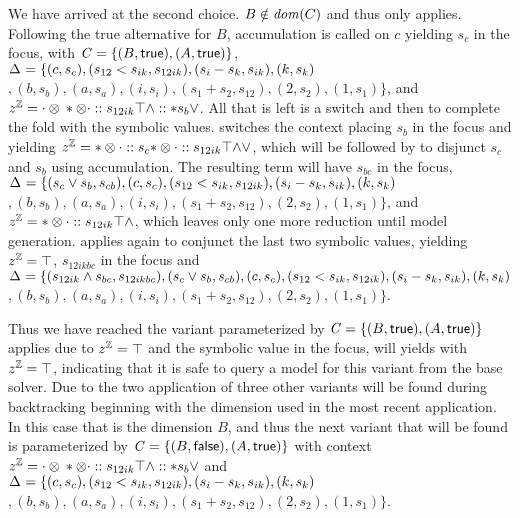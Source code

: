 We have arrived at the second choice. $B \notin \dom{C}$ and thus only \crChc
applies. Following the true alternative for $B$, accumulation is called on $c$
yielding $s_{c}$ in the focus, with $\configuration = \set{(B,\true),
  (A,\true)}$, $\aStore{}=\{(c,s_{c}),(s_{12} < s_{ik}, s_{12ik}),(s_{i} -
s_{k}, s_{ik}),(k,s_{k})$ $ ,(b, s_{b}), (a,s_{a}),(i, s_{i}),(s_{1} + s_{2},
s_{12}), (2,s_{2}), (1,s_{1})\}$, and $\zipper =
\inBoolL*{\inBoolR*{s_{12ik}}{\inRoot{}}{\wedge}}{s_{b}}{\vee}$. All that is
left is a switch and then to complete the fold with the symbolic values.
\crBoolL{} switches the context placing $s_{b}$ in the focus and yielding
$\zipper = \inBoolR*{s_{c}}{\inBoolR*{s_{12ik}}{\inRoot{}}{\wedge}}{\vee}$,
which will be followed by \crBoolR{} to disjunct $s_{c}$ and $s_{b}$ using
accumulation. The resulting term will have $s_{bc}$ in the focus,
$\aStore{}=\{(s_{c} \vee s_{b}, s_{cb}),(c,s_{c}),(s_{12} < s_{ik},
s_{12ik}),(s_{i} - s_{k}, s_{ik}),(k,s_{k})$ $ ,(b, s_{b}), (a,s_{a}),(i,
s_{i}),(s_{1} + s_{2}, s_{12}), (2,s_{2}), (1,s_{1})\}$, and $\zipper =
\inBoolR*{s_{12ik}}{\inRoot{}}{\wedge}$, which leaves only one more reduction
until model generation. \crBoolR{} applies again to conjunct the last two
symbolic values, yielding $\zipper = \inRoot{}$, $s_{12ikbc}$ in the focus and
$\aStore{}=\{(s_{12ik} \wedge s_{bc}, s_{12ikbc}), (s_{c} \vee s_{b},
s_{cb}),(c,s_{c}),(s_{12} < s_{ik}, s_{12ik}),(s_{i} - s_{k}, s_{ik}),(k,s_{k})$
$ ,(b, s_{b}), (a,s_{a}),(i, s_{i}),(s_{1} + s_{2}, s_{12}), (2,s_{2}),
(1,s_{1})\}$.

Thus we have reached the variant parameterized by
$\configuration=\set{(B,\true),(A,\true)}$ \crEval{} applies due to $\zipper =
\inRoot{}$ and the symbolic value in the focus, \evSym{} will yields \unit{}
with $\zipper = \inRoot{}$, indicating that it is safe to query a model for this
variant from the base solver. Due to the two application of \crChc{} three other
variants will be found during backtracking beginning with the dimension used in
the most recent application. In this case that is the dimension $B$, and thus
the next variant that will be found is parameterized by
$\configuration=\set{(B,\false),(A, \true)}$ with context $\zipper =
\inBoolL*{\inBoolR*{s_{12ik}}{\inRoot{}}{\wedge}}{s_{b}}{\vee}$ and
$\aStore{}=\{(c,s_{c}),(s_{12} < s_{ik}, s_{12ik}),(s_{i} - s_{k},
s_{ik}),(k,s_{k})$ $,(b, s_{b}), (a,s_{a}),(i, s_{i}),(s_{1} + s_{2}, s_{12}),
(2,s_{2}), (1,s_{1})\}$.

